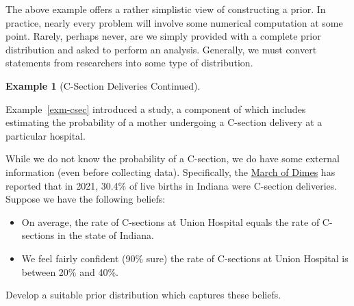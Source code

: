 \documentclass[
  letterpaper,
  DIV=11,
  numbers=noendperiod]{scrreprt}
\providecommand{\tightlist}{%
  \setlength{\itemsep}{0pt}\setlength{\parskip}{0pt}}\usepackage{longtable,booktabs,array}
\theoremstyle{definition}
\newtheorem{example}{Example}[chapter]
\theoremstyle{definition}
\theoremstyle{plain}
\theoremstyle{remark}
\begin{document}
The above example offers a rather simplistic view of constructing a
prior. In practice, nearly every problem will involve some numerical
computation at some point. Rarely, perhaps never, are we simply provided
with a complete prior distribution and asked to perform an analysis.
Generally, we must convert statements from researchers into some type of
distribution.

\begin{example}[C-Section Deliveries
Continued]\protect\hypertarget{exm-csec-prior}{}\label{exm-csec-prior}

Example~\ref{exm-csec} introduced a study, a component of which includes
estimating the probability of a mother undergoing a C-section delivery
at a particular hospital.

While we do not know the probability of a C-section, we do have some
external information (even before collecting data). Specifically, the
\href{https://www.marchofdimes.org/peristats/data?reg=99\&top=8\&stop=87\&lev=1\&slev=4\&obj=18\&sreg=18}{March
of Dimes} has reported that in 2021, 30.4\% of live births in Indiana
were C-section deliveries. Suppose we have the following beliefs:

\begin{itemize}
\tightlist
\item
  On average, the rate of C-sections at Union Hospital equals the rate
  of C-sections in the state of Indiana.
\item
  We feel fairly confident (90\% sure) the rate of C-sections at Union
  Hospital is between 20\% and 40\%.
\end{itemize}

Develop a suitable prior distribution which captures these beliefs.

\end{example}
\end{document}
